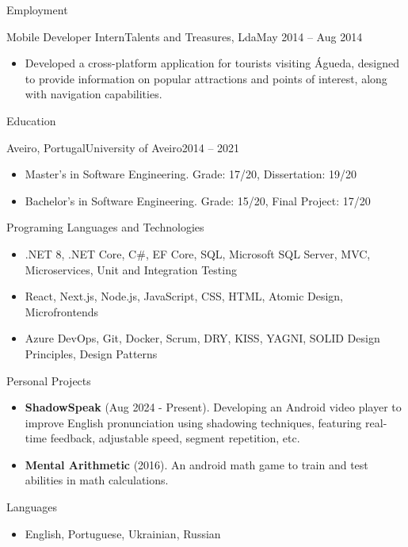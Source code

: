 \documentclass[]{mcdowellcv}
\begin{document}
\begin{cvsection}{Employment}
		\begin{cvsubsection}{Mobile Developer Intern}{Talents and Treasures, Lda}{May 2014 -- Aug 2014}		
			\begin{itemize}
				\item Developed a cross-platform application for tourists visiting Águeda, designed to provide information on popular attractions and points of interest, along with navigation capabilities.
			\end{itemize}
		\end{cvsubsection}
	\end{cvsection}
	
	\begin{cvsection}{Education}
		\begin{cvsubsection}{Aveiro, Portugal}{University of Aveiro}{2014 -- 2021}
			\begin{itemize}
				\item Master's in Software Engineering. Grade: 17/20, Dissertation: 19/20
				\item Bachelor's in Software Engineering. Grade: 15/20, Final Project: 17/20
			\end{itemize}
		\end{cvsubsection}
	\end{cvsection}

	\begin{cvsection}{Programing Languages and Technologies}
		\begin{cvsubsection}{}{}{}	
			\begin{itemize}
				\item .NET 8, .NET Core, C\#, EF Core, SQL, Microsoft SQL Server, MVC, Microservices, Unit and Integration Testing
				\item React, Next.js, Node.js, JavaScript, CSS, HTML, Atomic Design, Microfrontends
				\item Azure DevOps, Git, Docker, Scrum, DRY, KISS, YAGNI, SOLID Design Principles, Design Patterns
			\end{itemize}
		\end{cvsubsection}
	\end{cvsection}
	
	\begin{cvsection}{Personal Projects}
		\begin{cvsubsection}{}{}{}
			\begin{itemize}
				\item \textbf{ShadowSpeak} (Aug 2024 - Present). Developing an Android video player to improve English pronunciation using shadowing techniques, featuring real-time feedback, adjustable speed, segment repetition, etc.
				\item \textbf{Mental Arithmetic} (2016). An android math game to train and test abilities in math calculations.
			\end{itemize}
		\end{cvsubsection}
	\end{cvsection}

	\begin{cvsection}{Languages}
		\begin{cvsubsection}{}{}{}	
			\begin{itemize}
				\item English, Portuguese, Ukrainian, Russian
			\end{itemize}
		\end{cvsubsection}
	\end{cvsection}
	
\end{document}
